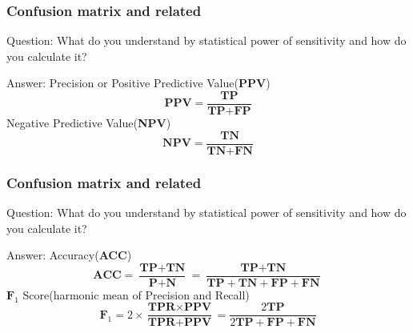 \documentclass[11pt]{beamer}
\begin{document}
\begin{frame}
\frametitle{Confusion matrix and related}
\begin{block}{Question:}
	What do you understand by statistical power of sensitivity and how do you calculate it?
\end{block}
\begin{block}{Answer:}
	Precision or Positive Predictive Value(\textbf{PPV})
	\[
		\textbf{PPV} = \frac{\textbf{TP}}{\textbf{TP}+\textbf{FP}}
	\]
	Negative Predictive Value(\textbf{NPV})
	\[
		\textbf{NPV} = \frac{\textbf{TN}}{\textbf{TN}+\textbf{FN}}
	\]
\end{block}
\end{frame}

\begin{frame}
\frametitle{Confusion matrix and related}
\begin{block}{Question:}
	What do you understand by statistical power of sensitivity and how do you calculate it?
\end{block}
\begin{block}{Answer:}
	Accuracy(\textbf{ACC})
	\[
		\textbf{ACC} = \frac{\textbf{TP}+\textbf{TN}}{\textbf{P}+\textbf{N}} = \frac{\textbf{TP}+\textbf{TN}}{\textbf{TP}+\textbf{TN} + \textbf{FP}+\textbf{FN}}
	\]
	$\textbf{F}_1$ Score(harmonic mean of Precision and Recall)
	\[
		\textbf{F}_1 = 2\times\frac{\textbf{TPR}\times\textbf{PPV}}{\textbf{TPR} + \textbf{PPV}} = \frac{2\textbf{TP}}{2\textbf{TP}+\textbf{FP}+\textbf{FN}}
	\]
\end{block}
\end{frame}
\end{document}
